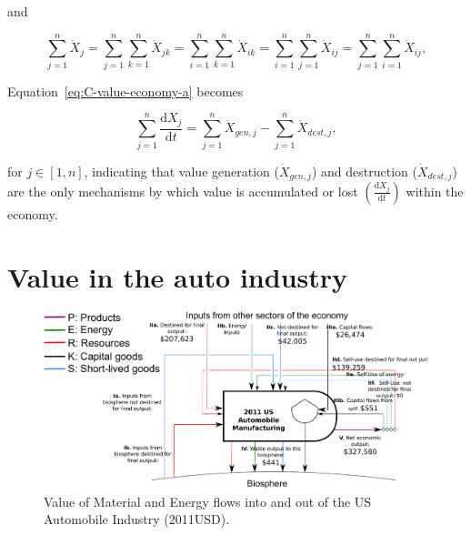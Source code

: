 \noindent{}and

\begin{equation} \label{eq:X_identity_2}
	\sum\limits_{j=1}^n\dot{X}_{j}  
	= \sum\limits_{j=1}^n \sum\limits_{k=1}^n \dot{X}_{jk}
	= \sum\limits_{i=1}^n \sum\limits_{k=1}^n \dot{X}_{ik}
	= \sum\limits_{i=1}^n \sum\limits_{j=1}^n \dot{X}_{ij}
	= \sum\limits_{j=1}^n \sum\limits_{i=1}^n \dot{X}_{ij},
\end{equation}

\noindent{}Equation~\ref{eq:C-value-economy-a} becomes

\begin{equation}\label{eq:C-value-economy-b}
	\sum\limits_{j=1}^{n} \frac{\mathrm{d}X_{j}}{\mathrm{d}t}
	= \sum\limits_{j=1}^{n} \dot{X}_{gen,j}
	- \sum\limits_{j=1}^{n} \dot{X}_{dest,j},
\end{equation}

\noindent{}for $j \in [1, n]$, indicating that 
value generation ($\dot{X}_{gen,j}$) 
and destruction ($\dot{X}_{dest,j}$)
are the only mechanisms by which value is accumulated or lost
$\left( \frac{\mathrm{d}X_{j}}{\mathrm{d}t} \right)$
within the economy.


\section{Value in the auto industry}
\label{sec:value_auto}

\begin{figure}[!ht]
\centering
\includegraphics[width=1.0\linewidth]{Part_2/Chapter_Values/images/PERKS_basic_unit_value_auto_ind.pdf}
\caption[Value of Material and Energy flows into and out of the US Automobile Industry]{Value of Material and Energy flows into and out of the US Automobile Industry (2011USD).}
\label{fig:PERKS_value_auto_ind}
\end{figure}


